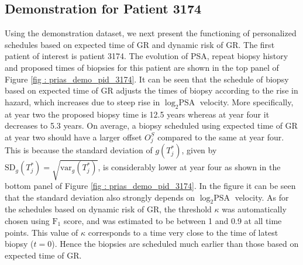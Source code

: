 \subsection{Demonstration for Patient 3174}
\label{subsec : demo_prias_pers_schedule}
Using the demonstration dataset, we next present the functioning of personalized schedules based on expected time of GR and dynamic risk of GR. The first patient of interest is patient 3174. The evolution of PSA, repeat biopsy history and proposed times of biopsies for this patient are shown in the top panel of Figure \ref{fig : prias_demo_pid_3174}. It can be seen that the schedule of biopsy based on expected time of GR adjusts the times of biopsy according to the rise in hazard, which increases due to steep rise in $\log_2 \mbox{PSA}$ velocity. More specifically, at year two the proposed biopsy time is 12.5 years whereas at year four it decreases to 5.3 years. On average, a biopsy scheduled using expected time of GR at year two should have a larger offset $O^S_j$ compared to the same at year four. This is because the standard deviation of $g(T^*_j)$, given by $\mbox{SD}_g(T^*_j) = \sqrt{\mbox{var}_g(T^*_j)}$, is considerably lower at year four as shown in the bottom panel of Figure \ref{fig : prias_demo_pid_3174}. In the figure it can be seen that the standard deviation also strongly depends on $\log_2 \mbox{PSA}$ velocity. As for the schedules based on dynamic risk of GR, the threshold $\kappa$ was automatically chosen using $\mbox{F}_1$ score, and was estimated to be between 1 and 0.9 at all time points. This value of $\kappa$ corresponds to a time very close to the time of latest biopsy ($t=0$). Hence the biopsies are scheduled much earlier than those based on expected time of GR.

